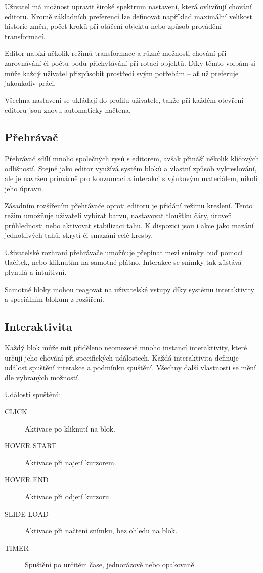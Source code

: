 Uživatel má možnost upravit široké spektrum nastavení, která ovlivňují chování editoru. 
Kromě základních preferencí lze definovat například maximální velikost historie změn, počet kroků při otáčení objektů nebo způsob provádění transformací.

Editor nabízí několik režimů transformace a různé možnosti chování při zarovnávání či počtu bodů přichytávání při rotaci objektů. 
Díky těmto volbám si může každý uživatel přizpůsobit prostředí svým potřebám -- ať už preferuje jakoukoliv práci.

Všechna nastavení se ukládají do profilu uživatele, takže při každém otevření editoru jsou znovu automaticky načtena.

\subsection{Přehrávač}

Přehrávač sdílí mnoho společných rysů s editorem, avšak přináší několik klíčových odlišností. 
Stejně jako editor využívá systém bloků a vlastní způsob vykreslování, ale je navržen primárně pro konzumaci a interakci s výukovým materiálem, nikoli jeho úpravu.

Zásadním rozšířením přehrávače oproti editoru je přidání režimu kreslení. 
Tento režim umožňuje uživateli vybírat barvu, nastavovat tloušťku čáry, úroveň průhlednosti nebo aktivovat stabilizaci tahu. 
K dispozici jsou i akce jako mazání jednotlivých tahů, skrytí či smazání celé kresby.

Uživatelské rozhraní přehrávače umožňuje přepínat mezi snímky buď pomocí tlačítek, nebo kliknutím na samotné plátno.
Interakce se snímky tak zůstává plynulá a intuitivní. 

Samotné bloky mohou reagovat na uživatelské vstupy díky systému interaktivity a speciálním blokům z rozšíření.

\subsection{Interaktivita}

Každý blok může mít přiděleno neomezeně mnoho instancí interaktivity, které určují jeho chování při specifických událostech. 
Každá interaktivita definuje událost spuštění interakce a podmínku spuštění.
Všechny další vlastnosti se mění dle vybraných možností.

Události spuštění:
\begin{description}
  \item[CLICK] Aktivace po kliknutí na blok.
  \item[HOVER START] Aktivace při najetí kurzorem.
  \item[HOVER END] Aktivace při odjetí kurzoru.
  \item[SLIDE LOAD] Aktivace při načtení snímku, bez ohledu na blok.
  \item[TIMER] Spuštění po určitém čase, jednorázově nebo opakovaně.
\end{description}


